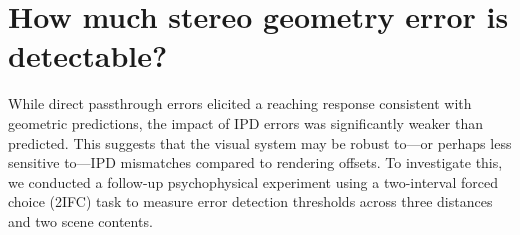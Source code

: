 \section{How much stereo geometry error is detectable?} \label{sec:visual}
While direct passthrough errors elicited a reaching response consistent with geometric predictions, the impact of IPD errors was significantly weaker than predicted. This suggests that the visual system may be robust to—or perhaps less sensitive to—IPD mismatches compared to rendering offsets. To investigate this, we conducted a follow-up psychophysical experiment using a two-interval forced choice (2IFC) task to measure error detection thresholds across three distances and two scene contents. 




